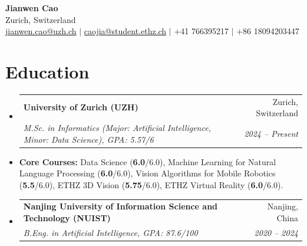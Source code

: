 \documentclass[a4paper,10pt]{article}
\makeatletter
\newcommand{\resumeSubheading}[4]{
  \vspace{-1pt}\item
    \begin{tabular*}{\textwidth}[t]{@{}l@{\extracolsep{\fill}}r@{}}
      \textbf{#1} & #2 \\
      \textit{\small#3} & \textit{\small #4} \\
    \end{tabular*}\vspace{-1pt} 
}
\makeatother
\begin{document}
\begin{center}
    {\Huge \textbf{Jianwen Cao}} \\ \vspace{0pt}
    Zurich, Switzerland \\ \vspace{0pt}
    \href{mailto:jianwen.cao@uzh.ch}{jianwen.cao@uzh.ch} $|$ 
    \href{mailto:caojia@student.ethz.ch}{caojia@student.ethz.ch} $|$ 
    +41 766395217 $|$ +86 18094203447
\end{center}


\section{Education}
  \begin{itemize}[leftmargin=0.15in, label={}]
    \resumeSubheading
      {University of Zurich (UZH)}{Zurich, Switzerland}
      {M.Sc. in Informatics (Major: Artificial Intelligence, Minor: Data Science), GPA: 5.57/6}{2024 -- Present}
      \item \small{\textbf{Core Courses:} Data Science (\textbf{6.0}/6.0), Machine Learning for Natural Language Processing (\textbf{6.0}/6.0), Vision Algorithms for Mobile Robotics (\textbf{5.5}/6.0), ETHZ 3D Vision (\textbf{5.75}/6.0), ETHZ Virtual Reality (\textbf{6.0}/6.0).}
    
    \resumeSubheading
      {Nanjing University of Information Science and Technology (NUIST)}{Nanjing, China}
      {B.Eng. in Artificial Intelligence, GPA: 87.6/100}{2020 -- 2024}
  \end{itemize}


\end{document}

